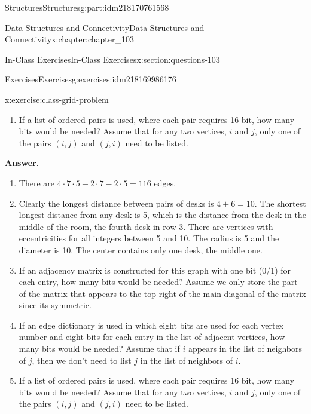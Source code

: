 \documentclass[oneside,10pt,]{book}
\newcommand{\blocktitlefont}{\relax}
\numberwithin{equation}{section}
\begin{document}
\begin{partptx}{Structures}{}{Structures}{}{}{g:part:idm218170761568}
\begin{chapterptx}{Data Structures and Connectivity}{}{Data Structures and Connectivity}{}{}{x:chapter:chapter_103}
\begin{sectionptx}{In-Class Exercises}{}{In-Class Exercises}{}{}{x:section:questions-103}
\begin{exercises-subsection-numberless}{Exercises}{}{Exercises}{}{}{g:exercises:idm218169986176}
\begin{exercisegroup}
\begin{divisionexerciseeg}{3}{}{}{x:exercise:class-grid-problem}
\begin{enumerate}[label=(\alph*)]
\item{}If a list of ordered pairs is used, where each pair requires 16 bit, how many bits would be needed?  Assume that for any two vertices, \(i\) and \(j\), only one of the pairs \((i,j)\) and \((j,i)\) need to be listed.%
\end{enumerate}
%
\par\smallskip%
\noindent\textbf{\blocktitlefont Answer}.\hypertarget{g:answer:idm218169973136}{}\quad{}%
\begin{enumerate}[label=(\alph*)]
\item{}There are \(4\cdot 7\cdot 5- 2\cdot7 - 2 \cdot 5= 116\) edges.%
\item{}Clearly the longest distance between pairs of desks is \(4+6= 10\). The shortest longest distance from any desk is 5, which is the distance from the desk in the middle of the room, the fourth desk in row 3.  There are vertices with eccentricities for all integers between 5 and 10.  The radius is 5 and the diameter is 10.   The center contains only one desk, the middle one.%
\item{}If an adjacency matrix is constructed for this graph with one bit (0\slash{}1) for each entry, how many bits would be needed?  Assume we only store the part of the matrix that appears to the top right of the main diagonal of the matrix since its symmetric.%
\item{}If an edge dictionary is used in which eight bits are used for each vertex number and eight bits for each entry in the list of adjacent vertices, how many bits would be needed? Assume that if \(i\) appears in the list of neighbors of \(j\), then we don't need to list \(j\) in the list of neighbors of \(i\).%
\item{}If a list of ordered pairs is used, where each pair requires 16 bit, how many bits would be needed?  Assume that for any two vertices, \(i\) and \(j\), only one of the pairs \((i,j)\) and \((j,i)\) need to be listed.%
\end{enumerate}
%
\end{divisionexerciseeg}%
\end{exercisegroup}
\par\medskip\noindent
\end{exercises-subsection-numberless}
\end{sectionptx}
\end{chapterptx}
%
\typeout{************************************************}
\typeout{************************************************}

\end{partptx}
\end{document}
